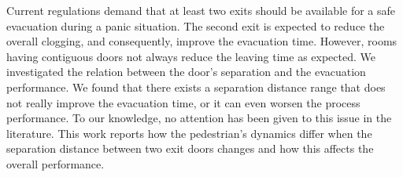 Current regulations demand that at least two exits should be available 
for a safe evacuation during a panic situation. The second exit is  
expected to reduce the overall clogging, and  consequently, improve the 
evacuation time. However, rooms having contiguous doors not always reduce the 
leaving time as expected. We investigated the relation between the door's 
separation and the evacuation performance. We found that there exists a 
separation distance range that does not really improve the evacuation time, or 
it can even worsen the process performance. To our knowledge, no attention has 
been given to this issue in the literature. This work reports how the 
pedestrian's dynamics differ when the separation distance between two exit doors 
changes and how this affects the overall performance.